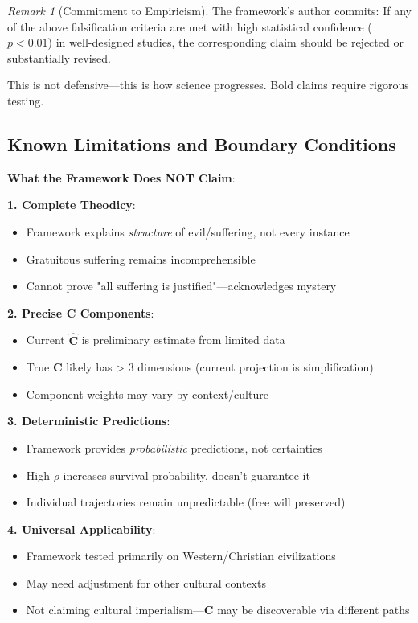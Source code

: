 \documentclass[11pt,a4paper]{article}
\theoremstyle{definition}
\theoremstyle{remark}
\newtheorem{remark}{Remark}[section]
\begin{document}
\begin{enumerate}
\begin{remark}[Commitment to Empiricism]
The framework's author commits: If any of the above falsification criteria are met with high statistical confidence (\(p < 0.01\)) in well-designed studies, the corresponding claim should be rejected or substantially revised.

This is not defensive—this is how science progresses. Bold claims require rigorous testing.
\end{remark}

\subsection{Known Limitations and Boundary Conditions}

\begin{mdframed}[backgroundcolor=yellow!10,linewidth=2pt]
\textbf{What the Framework Does NOT Claim}:

\textbf{1. Complete Theodicy}:
\begin{itemize}
    \item Framework explains \textit{structure} of evil/suffering, not every instance
    \item Gratuitous suffering remains incomprehensible
    \item Cannot prove "all suffering is justified"—acknowledges mystery
\end{itemize}

\textbf{2. Precise \(\mathbf{C}\) Components}:
\begin{itemize}
    \item Current \(\hat{\mathbf{C}}\) is preliminary estimate from limited data
    \item True \(\mathbf{C}\) likely has > 3 dimensions (current projection is simplification)
    \item Component weights may vary by context/culture
\end{itemize}

\textbf{3. Deterministic Predictions}:
\begin{itemize}
    \item Framework provides \textit{probabilistic} predictions, not certainties
    \item High \(\rho\) increases survival probability, doesn't guarantee it
    \item Individual trajectories remain unpredictable (free will preserved)
\end{itemize}

\textbf{4. Universal Applicability}:
\begin{itemize}
    \item Framework tested primarily on Western/Christian civilizations
    \item May need adjustment for other cultural contexts
    \item Not claiming cultural imperialism—\(\mathbf{C}\) may be discoverable via different paths
\end{itemize}


\end{mdframed}
\end{enumerate}
\end{document}
